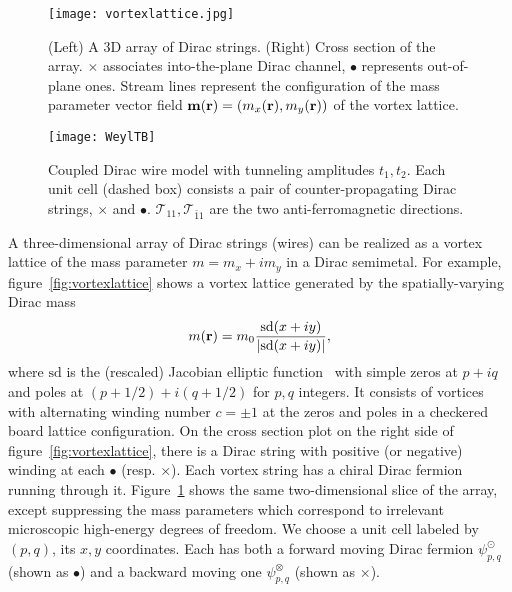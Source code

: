 \begin{figure}[htbp]
\centering\texttt{[image: vortexlattice.jpg]}
\caption{(Left) A 3D array of Dirac strings. (Right) Cross section of the array. {\color{red}$\boldsymbol\times$} associates into-the-plane Dirac channel, {\color{green}$\bullet$} represents out-of-plane ones. Stream lines represent the configuration of the mass parameter vector field ${\bf m}({\bf r})=(m_x({\bf r}),m_y({\bf r}))$ of the vortex lattice.}\label{fig:vortexlattice}
\centering\texttt{[image: WeylTB]}
\caption{Coupled Dirac wire model with tunneling amplitudes $t_1,t_2$. Each unit cell (dashed box) consists a pair of counter-propagating Dirac strings, {\color{red}$\boldsymbol\times$} and {\color{green}$\bullet$}. $\mathcal{T}_{11},\mathcal{T}_{\bar{1}1}$ are the two anti-ferromagnetic directions.}\label{fig:WeylTB}
\end{figure}

A three-dimensional array of Dirac strings (wires) can be realized as a vortex lattice of the mass parameter $m=m_x+im_y$ in a Dirac semimetal. For example, figure~\ref{fig:vortexlattice} shows a vortex lattice generated by the spatially-varying Dirac mass \begin{align}m({\bf r})=m_0\frac{\mathrm{sd}(x+iy)}{|\mathrm{sd}(x+iy)|},\label{Jacobielliptic}\end{align} where $\mathrm{sd}$ is the (rescaled) Jacobian elliptic function~\cite{ReinhardtWalker10} with simple zeros at $p+iq$ and poles at $(p+1/2)+i(q+1/2)$ for $p,q$ integers. It consists of vortices with alternating winding number $c=\pm1$ at the zeros and poles in a checkered board lattice configuration. On the cross section plot on the right side of figure~\ref{fig:vortexlattice}, there is a Dirac string with positive (or negative) winding at each {\color{green}$\bullet$} (resp. {\color{red}$\boldsymbol\times$}). Each vortex string has a chiral Dirac fermion running through it. Figure~\ref{fig:WeylTB} shows the same two-dimensional slice of the array, except suppressing the mass parameters which correspond to irrelevant microscopic high-energy degrees of freedom. We choose a unit cell labeled by $(p,q)$, its $x,y$ coordinates. Each has both a forward moving Dirac fermion $\psi_{p,q}^\odot$ (shown as {\color{green}$\bullet$}) and a backward moving one $\psi_{p,q}^\otimes$ (shown as {\color{red}$\boldsymbol\times$}). 

